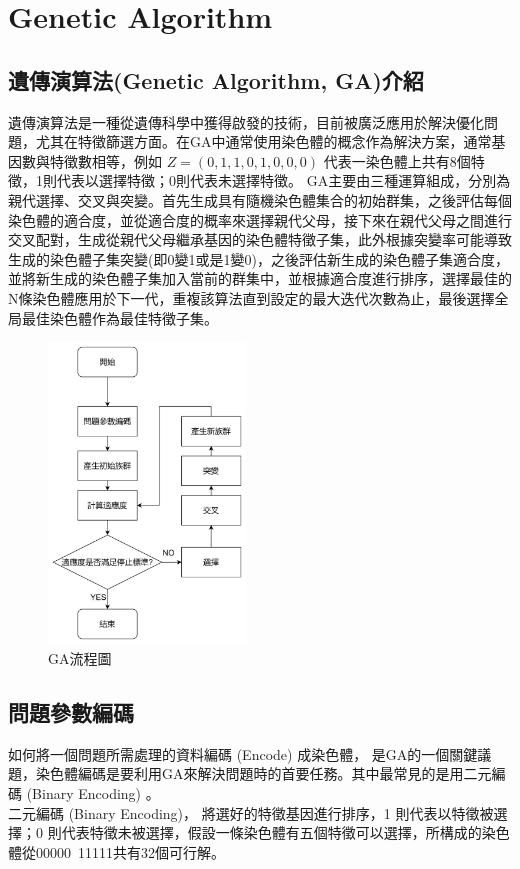 \chapter{Genetic Algorithm}
\label{chapter:intro}
\section{遺傳演算法(Genetic Algorithm, GA)介紹}
遺傳演算法是一種從遺傳科學中獲得啟發的技術，目前被廣泛應用於解決優化問題，尤其在特徵篩選方面。在GA中通常使用染色體的概念作為解決方案，通常基因數與特徵數相等，例如 \(Z=(0,1,1,0,1,0,0,0)\) 代表一染色體上共有8個特徵，1則代表以選擇特徵；0則代表未選擇特徵。
GA主要由三種運算組成，分別為親代選擇、交叉與突變。首先生成具有隨機染色體集合的初始群集，之後評估每個染色體的適合度，並從適合度的概率來選擇親代父母，接下來在親代父母之間進行交叉配對，生成從親代父母繼承基因的染色體特徵子集，此外根據突變率可能導致生成的染色體子集突變(即0變1或是1變0)，之後評估新生成的染色體子集適合度，並將新生成的染色體子集加入當前的群集中，並根據適合度進行排序，選擇最佳的N條染色體應用於下一代，重複該算法直到設定的最大迭代次數為止，最後選擇全局最佳染色體作為最佳特徵子集。
\begin{figure}[H]
	\centerline{\includegraphics[height=8cm]{pic/GAFlowChart.PNG}}
	\caption{GA流程圖}
	\label{fig:GAFlowChart}
\end{figure}

\label{sec:background}
\section{問題參數編碼}
如何將一個問題所需處理的資料編碼 (Encode) 成染色體，
是GA的一個關鍵議題，染色體編碼是要利用GA來解決問題時的首要任務。其中最常見的是用二元編碼 (Binary Encoding) 。\\
二元編碼 (Binary Encoding)，
將選好的特徵基因進行排序，1 則代表以特徵被選擇；0 則代表特徵未被選擇，假設一條染色體有五個特徵可以選擇，所構成的染色體從00000~11111共有32個可行解。

